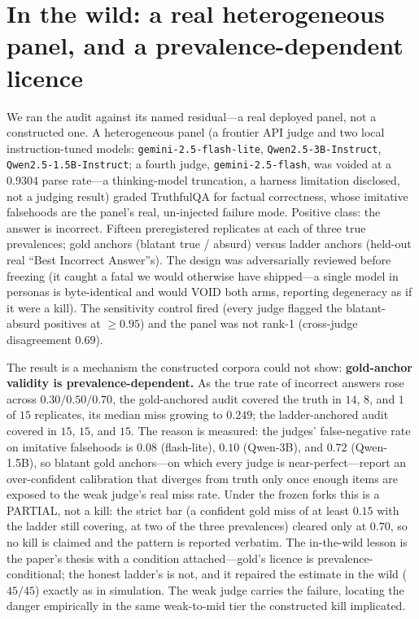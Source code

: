 \documentclass[11pt]{article}
\begin{document}
\section{In the wild: a real heterogeneous panel, and a prevalence-dependent licence}

We ran the audit against its named residual---a real deployed panel, not a constructed one. A
heterogeneous panel (a frontier API judge and two local instruction-tuned models:
\texttt{gemini-2.5-flash-lite}, \texttt{Qwen2.5-3B-Instruct}, \texttt{Qwen2.5-1.5B-Instruct}; a fourth
judge, \texttt{gemini-2.5-flash}, was voided at a $0.9304$ parse rate---a thinking-model truncation, a
harness limitation disclosed, not a judging result) graded TruthfulQA for factual correctness, whose
imitative falsehoods are the panel's real, un-injected failure mode. Positive class: the answer is
incorrect. Fifteen preregistered replicates at each of three true prevalences; gold anchors (blatant
true / absurd) versus ladder anchors (held-out real ``Best Incorrect Answer''s). The design was
adversarially reviewed before freezing (it caught a fatal we would otherwise have shipped---a single
model in personas is byte-identical and would VOID both arms, reporting degeneracy as if it were a
kill). The sensitivity control fired (every judge flagged the blatant-absurd positives at $\geq 0.95$)
and the panel was not rank-1 (cross-judge disagreement $0.69$).

The result is a mechanism the constructed corpora could not show: \textbf{gold-anchor validity is
prevalence-dependent.} As the true rate of incorrect answers rose across $0.30 / 0.50 / 0.70$, the
gold-anchored audit covered the truth in $14$, $8$, and $1$ of $15$ replicates, its median miss growing
to $0.249$; the ladder-anchored audit covered in $15$, $15$, and $15$. The reason is measured: the
judges' false-negative rate on imitative falsehoods is $0.08$ (flash-lite), $0.10$ (Qwen-3B), and
$0.72$ (Qwen-1.5B), so blatant gold anchors---on which every judge is near-perfect---report an
over-confident calibration that diverges from truth only once enough items are exposed to the weak
judge's real miss rate. Under the frozen forks this is a PARTIAL, not a kill: the strict bar (a
confident gold miss of at least $0.15$ with the ladder still covering, at two of the three prevalences)
cleared only at $0.70$, so no kill is claimed and the pattern is reported verbatim. The in-the-wild
lesson is the paper's thesis with a condition attached---gold's licence is prevalence-conditional; the
honest ladder's is not, and it repaired the estimate in the wild ($45/45$) exactly as in simulation.
The weak judge carries the failure, locating the danger empirically in the same weak-to-mid tier the
constructed kill implicated.
\end{document}
